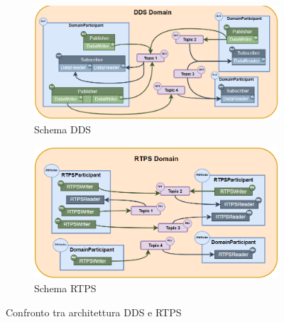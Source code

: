 \begin{figure}[H]
    \centering
    \begin{subfigure}{0.45\linewidth} %
      \centering
      \includegraphics[width=\linewidth]{./img/dds_architecture.png}
      \caption{Schema DDS}\label{fig:dds}
    \end{subfigure}
    \begin{subfigure}{0.45\linewidth} %
      \centering
      \includegraphics[width=\linewidth]{./img/rtps_architecture.png}
      \caption{Schema RTPS}\label{fig:rtps}
    \end{subfigure}
    \caption{Confronto tra architettura DDS e RTPS}\label{fig:confrontodds_rtps}
  \end{figure}



